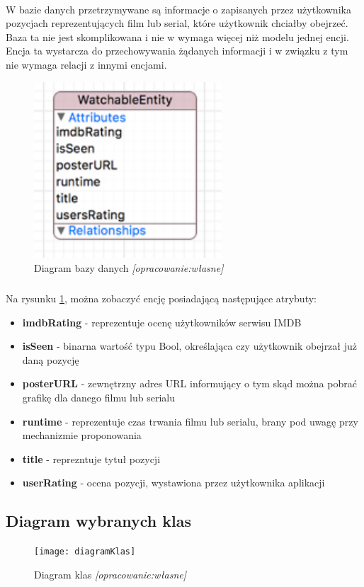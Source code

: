\documentclass[12pt,oneside,a4paper]{report}
\begin{document}
\paragraph{}W bazie danych przetrzymywane są informacje o zapisanych przez użytkownika pozycjach reprezentujących film lub serial, które użytkownik chciałby obejrzeć. Baza ta nie jest skomplikowana i nie w wymaga więcej niż modelu jednej encji. Encja ta wystarcza do przechowywania żądanych informacji i w związku z tym nie wymaga relacji z innymi encjami.
\begin{figure}[ht!]
	\centering
	\includegraphics[width=7cm]{watchableEntity}
	\caption{Diagram bazy danych 
		\textit{[opracowanie:własne]}}
	\label{watchableEntity}
\end{figure}
\subparagraph{}Na rysunku \ref{watchableEntity}, można zobaczyć encję posiadającą następujące atrybuty:
\begin{itemize}
	\item \textbf{imdbRating} - reprezentuje ocenę użytkowników serwisu IMDB
	\item \textbf{isSeen} - binarna wartość typu Bool, określająca czy użytkownik obejrzał już daną pozycję  
	\item \textbf{posterURL} - zewnętrzny adres URL informujący o tym skąd można pobrać grafikę dla danego filmu lub serialu
	\item \textbf{runtime} - reprezentuje czas trwania filmu lub serialu, brany pod uwagę przy mechanizmie proponowania
	\item \textbf{title} - reprezntuje tytuł pozycji
	\item \textbf{userRating} - ocena pozycji, wystawiona przez użytkownika aplikacji 
\end{itemize}
\newpage

\begin{landscape}
	\subsection{Diagram wybranych klas}
	\begin{figure}[ht!]
		\centering
		\texttt{[image: diagramKlas]}
		\caption{Diagram klas
			\textit{[opracowanie:własne]}}
		\label{diagramKlas}
	\end{figure}
\end{landscape}
\end{document}

